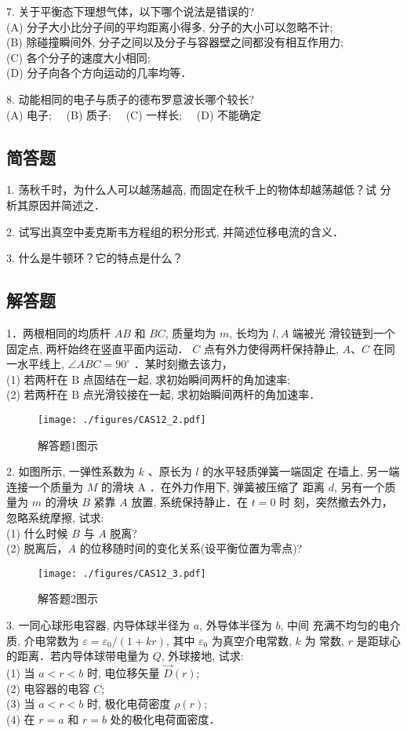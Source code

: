 7. 关于平衡态下理想气体，以下哪个说法是错误的?\\
(A) 分子大小比分子间的平均距离小得多, 分子的大小可以忽略不计;\\
(B) 除碰撞瞬间外, 分子之间以及分子与容器壁之间都没有相互作用力;\\
(C) 各个分子的速度大小相同;\\
(D) 分子向各个方向运动的几率均等．

8. 动能相同的电子与质子的德布罗意波长哪个较长?\\
(A) 电子;$\quad$
(B) 质子;$\quad$
(C) 一样长;$\quad$
(D) 不能确定

\subsection{简答题}

1. 荡秋千时，为什么人可以越荡越高, 而固定在秋千上的物体却越荡越低？试 分析其原因并简述之．

2. 试写出真空中麦克斯韦方程组的积分形式, 并简述位移电流的含义．

3. 什么是牛顿环？它的特点是什么？
\subsection{解答题}
1．两根相同的均质杆 $A B$ 和 $B C$, 质量均为 $m$, 长均为 $l, A$ 端被光 滑铰链到一个固定点, 两杆始终在竖直平面内运动． $C$ 点有外力使得两杆保持静止, $A $、$ C$ 在同一水平线上, $\angle A B C=90^{\circ}$ ．某时刻撤去该力，\\
(1) 若两杆在 $\mathrm{B}$ 点固结在一起, 求初始瞬间两杆的角加速率;\\
(2) 若两杆在 $\mathrm{B}$ 点光滑铰接在一起, 求初始瞬间两杆的角加速率．
\begin{figure}[ht]
\centering
\texttt{[image: ./figures/CAS12\_2.pdf]}
\caption{解答题1图示} \label{CAS12_fig2}
\end{figure}

2. 如图所示, 一弹性系数为 $k$ 、原长为 $l$ 的水平轻质弹簧一端固定 在墙上, 另一端连接一个质量为 $M$ 的滑块 $\mathrm{A}$ ．在外力作用下, 弹簧被压缩了 距离 $d$, 另有一个质量为 $m$ 的滑块 $B$ 紧靠 $A$ 放置, 系统保持静止．在 $t=0$ 时 刻，突然撤去外力，忽略系统摩擦, 试求:\\
(1) 什么时候 $B$ 与 $A$ 脱离?\\
(2) 脱离后，$A$ 的位移随时间的变化关系(设平衡位置为零点)?
\begin{figure}[ht]
\centering
\texttt{[image: ./figures/CAS12\_3.pdf]}
\caption{解答题2图示} \label{CAS12_fig3}
\end{figure}
3. 一同心球形电容器, 内导体球半径为 $a$, 外导体半径为 $b$, 中间 充满不均匀的电介质, 介电常数为 $\varepsilon=\varepsilon_{0} /(1+k r)$, 其中 $\varepsilon_{0}$ 为真空介电常数, $k$ 为 常数, $r$ 是距球心的距离．若内导体球带电量为 $Q$, 外球接地, 试求:\\
(1) 当 $a<r< b$ 时, 电位移矢量 $\vec{D}(r)$; \\
(2) 电容器的电容 $C$; \\
(3) 当 $a<r< b$ 时, 极化电荷密度 $\rho(r)$; \\
(4) 在 $r=a$ 和 $r=b$ 处的极化电荷面密度．


